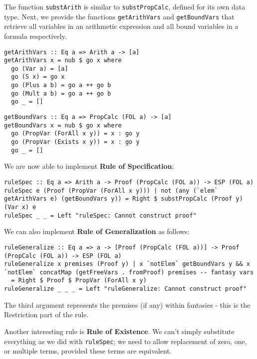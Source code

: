 \documentclass{article}
\begin{document}
The function \texttt{substArith} is similar to \texttt{substPropCalc}, defined for its own data type. Next, we provide the functions \texttt{getArithVars} and \texttt{getBoundVars} that retrieve all variables in an arithmetic expression and all bound variables in a formula respectively.

\begin{minipage}{0.49\textwidth}
\begin{lstlisting}
getArithVars :: Eq a => Arith a -> [a]
getArithVars x = nub $ go x where
  go (Var a) = [a]
  go (S x) = go x
  go (Plus a b) = go a ++ go b
  go (Mult a b) = go a ++ go b
  go _ = []
\end{lstlisting}
\end{minipage}
\begin{minipage}{0.49\textwidth}
\begin{lstlisting}
getBoundVars :: Eq a => PropCalc (FOL a) -> [a]
getBoundVars x = nub $ go x where
  go (PropVar (ForAll x y)) = x : go y
  go (PropVar (Exists x y)) = x : go y
  go _ = []
\end{lstlisting}
\end{minipage}

We are now able to implement \textbf{Rule of Specification}:

\begin{lstlisting}
ruleSpec :: Eq a => Arith a -> Proof (PropCalc (FOL a)) -> ESP (FOL a)
ruleSpec e (Proof (PropVar (ForAll x y))) | not (any (`elem` getArithVars e) (getBoundVars y)) = Right $ substPropCalc (Proof y) (Var x) e
ruleSpec _ _ = Left "ruleSpec: Cannot construct proof"
\end{lstlisting}

We can also implement \textbf{Rule of Generalization} as follows:

\begin{lstlisting}
ruleGeneralize :: Eq a => a -> [Proof (PropCalc (FOL a))] -> Proof (PropCalc (FOL a)) -> ESP (FOL a)
ruleGeneralize x premises (Proof y) | x `notElem` getBoundVars y && x `notElem` concatMap (getFreeVars . fromProof) premises -- fantasy vars
  = Right $ Proof $ PropVar (ForAll x y)
ruleGeneralize _ _ _ = Left "ruleGeneralize: Cannot construct proof"
\end{lstlisting}

The third argument represents the premises (if any) within fantasies - this is the Restriction part of the rule.

Another interesting rule is \textbf{Rule of Existence}. We can't simply substitute everything as we did with \texttt{ruleSpec}; we need to allow replacement of zero, one, or multiple terms, provided these terms are equivalent.
\end{document}

